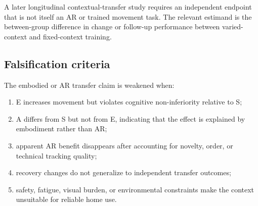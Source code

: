 A later longitudinal contextual-transfer study requires an independent endpoint that is not itself an AR or trained movement task. The relevant estimand is the between-group difference in change or follow-up performance between varied-context and fixed-context training.

\subsection{Falsification criteria}

The embodied or AR transfer claim is weakened when:

\begin{enumerate}
\item E increases movement but violates cognitive non-inferiority relative to S;
\item A differs from S but not from E, indicating that the effect is explained by embodiment rather than AR;
\item apparent AR benefit disappears after accounting for novelty, order, or technical tracking quality;
\item recovery changes do not generalize to independent transfer outcomes;
\item safety, fatigue, visual burden, or environmental constraints make the context unsuitable for reliable home use.
\end{enumerate}
